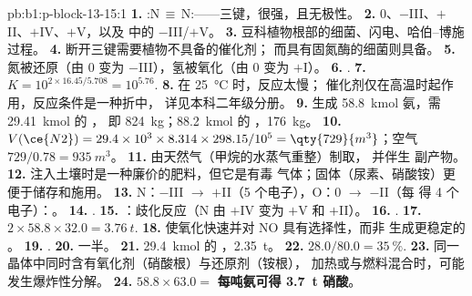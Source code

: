 \begin{solution}{pb:b1:p-block-13-15:1}
\textbf{1.} :N\,$\equiv$\,N:——三键，很强，且无极性。
\textbf{2.} 0、$-$III、$+$II、$+$IV、$+$V，以及  中的 $-$III/$+$V。
\textbf{3.} 豆科植物根部的细菌、闪电、哈伯–博施
过程。
\textbf{4.} 断开三键需要植物不具备的催化剂；
而具有固氮酶的细菌则具备。
\textbf{5.} 氮被还原（由 0 变为 $-$III），氢被氧化（由 0 变为 $+$I）。
\textbf{6.} .
\textbf{7.} $K = 10^{2 \times 16.45/5.708} = 10^{5.76}$.
\textbf{8.} 在 \qty{25}{\celsius} 时，反应太慢；
催化剂仅在高温时起作用，反应条件是一种折中，
详见本科二年级分册。
\textbf{9.} 生成 \qty{58.8}{kmol} 氨，需 \qty{29.41}{kmol} 的 ，
即 \qty{824}{kg}；\qty{88.2}{kmol} 的 ，\qty{176}{kg}。
\textbf{10.} $V(\ce{N2}) = 29.4 \times 10^3 \times 8.314 \times 298.15/10^5 =
\qty{729}{m^3}$；空气 $729/0.78 = \qty{935}{m^3}$。
\textbf{11.} 由天然气（甲烷的水蒸气重整）制取，
并伴生  副产物。
\textbf{12.} 注入土壤时是一种廉价的肥料，但它是有毒
气体；固体（尿素、硝酸铵）更便于储存和施用。
\textbf{13.} N：$-$III $\to$ $+$II（5 个电子），O：0 $\to$ $-$II（每
 得 4 个电子）：。
\textbf{14.} .
\textbf{15.} ：歧化反应（N 由 $+$IV 变为
$+$V 和 $+$II）。
\textbf{16.} .
\textbf{17.} $2 \times 58.8 \times 32.0 = \qty{3.76}{t}$.
\textbf{18.} 使氧化快速并对 NO 具有选择性，而非
生成更稳定的 。
\textbf{19.} .
\textbf{20.} 一半。
\textbf{21.} \qty{29.4}{kmol} 的 ，\qty{2.35}{t}。
\textbf{22.} $28.0/80.0 = \qty{35}{\percent}$.
\textbf{23.} 同一晶体中同时含有氧化剂（硝酸根）与还原剂（铵根），
加热或与燃料混合时，可能发生爆炸性分解。
\textbf{24.} $58.8 \times 63.0 =$ \textbf{每吨氨可得 \qty{3.7}{t}
硝酸}。
\end{solution}

